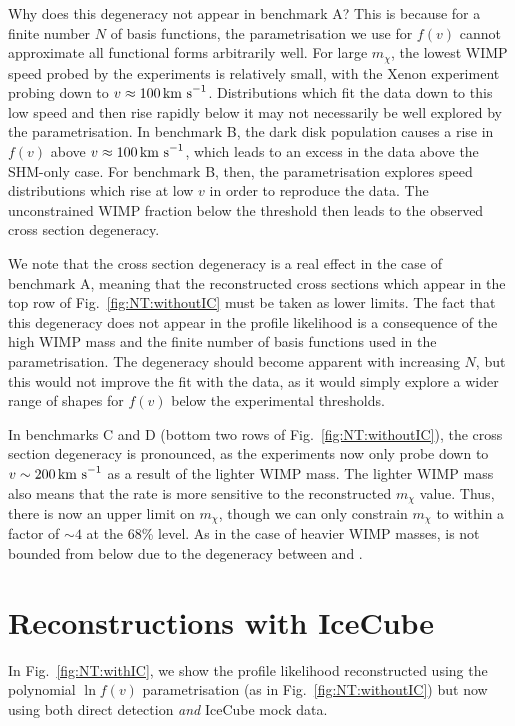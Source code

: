 Why does this degeneracy not appear in benchmark A? This is because for a finite number $N$ of basis functions, the parametrisation we use for $f(v)$ cannot approximate all functional forms arbitrarily well. For large $m_\chi$, the lowest WIMP speed probed by the experiments is relatively small, with the Xenon experiment probing down to $v \approx 100 \,\textrm{km s}^{-1}$. Distributions which fit the data down to this low speed and then rise rapidly below it may not necessarily be well explored by the parametrisation. In benchmark B, the dark disk population causes a rise in $f(v)$ above $v \approx 100 \,\textrm{km s}^{-1}$, which leads to an excess in the data above the SHM-only case. For benchmark B, then, the parametrisation explores speed distributions which rise at low $v$ in order to reproduce the data. The unconstrained WIMP fraction below the threshold then leads to the observed cross section degeneracy.

We note that the cross section degeneracy is a real effect in the case of benchmark A, meaning that the reconstructed cross sections which appear in the top row of Fig.~\ref{fig:NT:withoutIC} must be taken as lower limits. The fact that this degeneracy does not appear in the profile likelihood is a consequence of the high WIMP mass and the finite number of basis functions used in the parametrisation. The degeneracy should become apparent with increasing $N$, but this would not improve the fit with the data, as it would simply explore a wider range of shapes for $f(v)$ below the experimental thresholds.

In benchmarks C and D (bottom two rows of Fig.~\ref{fig:NT:withoutIC}), the cross section degeneracy is pronounced, as the experiments now only probe down to $v\sim 200 \,\textrm{km s}^{-1}$ as a result of the lighter WIMP mass. The lighter WIMP mass also means that the rate is more sensitive to the reconstructed $m_\chi$ value. Thus, there is now an upper limit on $m_\chi$, though we can only constrain $m_\chi$ to within a factor of $\sim 4$ at the 68\% level. As in the case of heavier WIMP masses, \sigmapsd is not bounded from below due to the degeneracy between \sigmapsi and \sigmapsd.

\section{Reconstructions with IceCube}
\label{sec:NT:withIC}
In Fig.~\ref{fig:NT:withIC}, we show the profile likelihood reconstructed using the polynomial $\ln f(v)$ parametrisation (as in Fig.~\ref{fig:NT:withoutIC}) but now using both direct detection \textit{and} IceCube mock data. 

